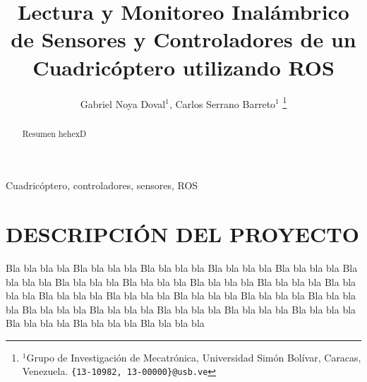 \documentclass[letterpaper, 10 pt, conference]{ieeeconf}  %
\title{\LARGE \bf
Lectura y Monitoreo Inalámbrico de Sensores y Controladores de un Cuadricóptero utilizando ROS
}
\author{Gabriel Noya Doval$^{1}$, Carlos Serrano Barreto$^{1}$%
\thanks{$^{1}$Grupo de Investigación de Mecatrónica, Universidad Simón Bolívar, Caracas, Venezuela.
        {\tt\small \{13-10982, 13-00000\}@usb.ve}}%
}
\begin{document}
\maketitle
\thispagestyle{empty}
\pagestyle{empty}
\begin{abstract}

Resumen hehexD
\\
\end{abstract}

\begin{keywords}
Cuadricóptero, controladores, sensores, ROS
\end{keywords}

\section{DESCRIPCIÓN DEL PROYECTO}

Bla bla bla bla Bla bla bla bla Bla bla bla bla Bla bla bla bla
Bla bla bla bla Bla bla bla bla Bla bla bla bla Bla bla bla bla
Bla bla bla bla Bla bla bla bla Bla bla bla bla Bla bla bla bla
Bla bla bla bla Bla bla bla bla Bla bla bla bla Bla bla bla bla
Bla bla bla bla Bla bla bla bla Bla bla bla bla Bla bla bla bla
Bla bla bla bla Bla bla bla bla Bla bla bla bla Bla bla bla bla
\end{document}

